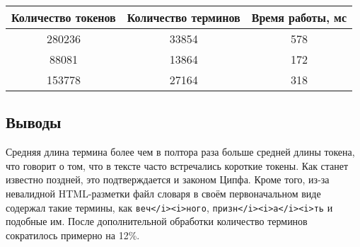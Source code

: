 \documentclass[a4paper, 12pt]{article}
\begin{document}
\begin{tabular}{|c|c|c|}
\hline
Количество токенов & Количество терминов & Время работы, мс \\
\hline
280236 & 33854 & 578 \\
88081 & 13864 & 172 \\
153778 & 27164 & 318 \\
\hline
\end{tabular}

\vspace{1cm}


\subsection*{Выводы}
Средняя длина термина более чем в полтора раза больше средней длины токена, что говорит о том, что в тексте часто встречались короткие токены. Как станет известно поздней, это подтверждается и законом Ципфа. Кроме того, из-за невалидной HTML-разметки файл словаря в своём первоначальном виде содержал такие термины, как {\tt веч</i><i>ного}, {\tt призн</i><i>а</i><i>ть} и подобные им. После дополнительной обработки количество терминов сократилось примерно на 12\%.
\end{document}
